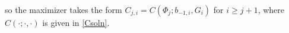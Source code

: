 \documentclass[12pt]{article}
\DeclareMathOperator*{\argmax}{arg\,max}
\newcommand{\TS}[1]{{\textcolor{magenta}{#1}}}
\begin{document}
so the maximizer takes the form
$C_{j, i} = C(\Phi_j; b_{-1, i}, G_{i}) $ for $i\geq j+1$, where $C(\cdot; \cdot, \cdot )$ is given in \eqref{Csoln}. 


%

\medskip

\end{document}
